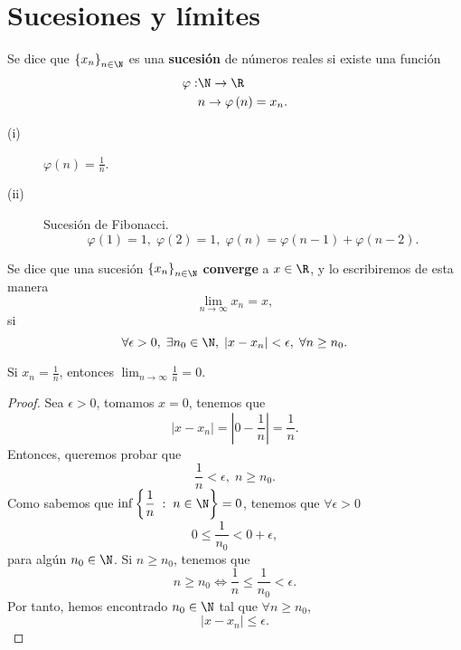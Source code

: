 \chapter{Sucesiones y límites}

\begin{fdefinition}[]
	\normalfont Se dice que $\displaystyle \left\{ x_{n}\right\}_{n\in\N}  $ es una \textbf{sucesión} de números reales si existe una función
\[
\begin{split}
	\varphi: &\N \to \R\\
& n \to \varphi\left(n\right) = x_{n}.
\end{split}
\]
\end{fdefinition}

\begin{eg}
\normalfont 
\begin{description}
\item[(i)] $\displaystyle \varphi\left(n\right) = \frac{1}{n} $.
\item[(ii)] Sucesión de Fibonacci.
	\[\varphi\left(1\right) = 1, \; \varphi\left(2\right) = 1, \; \varphi\left(n\right) = \varphi\left(n-1\right) + \varphi\left(n-2\right) .\]
\end{description}
\end{eg}

\begin{fdefinition}[]
	\normalfont Se dice que una sucesión $\displaystyle \left\{ x_{n}\right\}_{n\in \N} $ \textbf{converge} a $\displaystyle x \in \R $, y lo escribiremos de esta manera
	\[\lim_{n \to \infty}x_{n}=x ,\]
si
\[\forall \epsilon > 0, \; \exists n_{0}\in \N,\;  \left|x - x_{n}\right|<\epsilon, \; \forall n \geq n_{0}  .\]
\end{fdefinition}

\begin{fprop}[]
	\normalfont Si $\displaystyle x_{n}= \frac{1}{n} $, entonces $\displaystyle \lim_{n \to \infty}\frac{1}{n} = 0 $.
\end{fprop}

\begin{proof}
Sea $\displaystyle \epsilon > 0 $, tomamos $\displaystyle x = 0 $, tenemos que 
\[ \left|x - x_{n}\right| = \left|0 - \frac{1}{n}\right| = \frac{1}{n} .\]
Entonces, queremos probar que 
\[\frac{1}{n}<\epsilon, \; n \geq n_{0} .\]
Como sabemos que $\displaystyle \inf \left\{ \frac{1}{n} \; : \; n \in \N\right\} = 0 $, tenemos que $\displaystyle \forall \epsilon > 0 $ 
\[0 \leq \frac{1}{n_{0}} < 0 + \epsilon ,\]
para algún $\displaystyle n_{0} \in \N $. Si $\displaystyle n \geq n_{0} $, tenemos que
\[n \geq n_{0} \iff \frac{1}{n} \leq \frac{1}{n_{0}}<\epsilon .\]
Por tanto, hemos encontrado $\displaystyle n_{0}\in \N $ tal que $\displaystyle \forall n \geq n_{0} $, 
\[ \left|x - x_{n}\right| \leq \epsilon  .\]
\end{proof}

